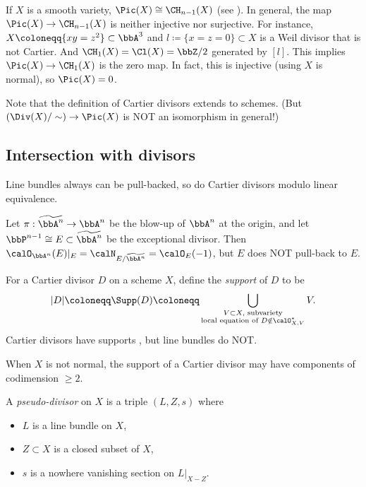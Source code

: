   \begin{example}
    If $X$ is a smooth variety, $\Pic (X) \cong \CH_{n-1} (X)$ (see \cite[Chapter II, Section 6]{Har77}).
    In general, the map $\Pic (X) \to \CH_{n-1} (X)$ is neither injective nor surjective.
    For instance, $X \coloneqq \{x y = z^2\} \subset \bbA^3$ and $l \coloneqq \{x = z = 0\} \subset X$ is a Weil divisor that is not Cartier.
    And $\CH_1 (X) = \Cl (X) = \bbZ/2$ generated by $[l]$.
    This implies $\Pic(X) \to \CH_1 (X)$ is the zero map.
    In fact, this is injective (using $X$ is normal), so $\Pic(X) = 0$.
  \end{example}

  Note that the definition of Cartier divisors extends to schemes.
  (But $\left(\Div(X)/\sim\right) \to \Pic (X)$ is NOT an isomorphism in general!)

\subsection{Intersection with divisors}

  Line bundles always can be pull-backed, so do Cartier divisors modulo linear equivalence.

  \begin{example}
    Let $\pi: \widetilde{\bbA^n} \to \bbA^n$ be the blow-up of $\bbA^n$ at the origin, and let $\bbP^{n-1} \cong E \subset \widetilde{\bbA^n}$ be the exceptional divisor.
    Then $\calO_{\bbA^n}(E)|_E = \calN_{E/\widetilde{\bbA^n}} = \calO_E(-1)$, but $E$ does NOT pull-back to $E$.
  \end{example}

  For a Cartier divisor $D$ on a scheme $X$, define the \emph{support} of $D$ to be
  \[ |D| \coloneqq \Supp (D) \coloneqq \bigcup_{\substack{V \subset X, \text{ subvariety} \\ \text{local equation of } D \notin \calO_{X,V}^*}} V . \]
  Cartier divisors have supports , but line bundles do NOT.

  \begin{remark}
    When $X$ is not normal, the support of a Cartier divisor may have components of codimension $\geq 2$.
    \Yang{}
  \end{remark}

  \begin{definition}
    A \emph{pseudo-divisor} on $X$ is a triple $(L,Z,s)$ where 
    \begin{itemize}
      \item $L$ is a line bundle on $X$,
      \item $Z \subset X$ is a closed subset of $X$,
      \item $s$ is a nowhere vanishing section on $L|_{X-Z}$.
    \end{itemize}
  \end{definition}

